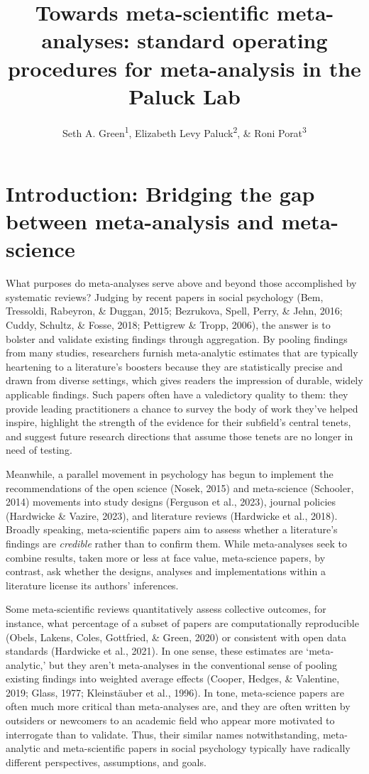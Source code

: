 \documentclass[
  ,jou]{apa6}
\title{Towards meta-scientific meta-analyses: standard operating procedures for meta-analysis in the Paluck Lab}
\author{Seth A. Green\textsuperscript{1}, Elizabeth Levy Paluck\textsuperscript{2}, \& Roni Porat\textsuperscript{3}}
\date{}
\affiliation{\vspace{0.5cm}\textsuperscript{1} Kahneman-Treisman Center, Princeton University\\\textsuperscript{2} Princeton University\\\textsuperscript{3} Hebrew University, Jerusalem}
\begin{document}
\maketitle

\section{Introduction: Bridging the gap between meta-analysis and meta-science}\label{introduction-bridging-the-gap-between-meta-analysis-and-meta-science}

What purposes do meta-analyses serve above and beyond those accomplished by systematic reviews? Judging by recent papers in social psychology (Bem, Tressoldi, Rabeyron, \& Duggan, 2015; Bezrukova, Spell, Perry, \& Jehn, 2016; Cuddy, Schultz, \& Fosse, 2018; Pettigrew \& Tropp, 2006), the answer is to bolster and validate existing findings through aggregation. By pooling findings from many studies, researchers furnish meta-analytic estimates that are typically heartening to a literature's boosters because they are statistically precise and drawn from diverse settings, which gives readers the impression of durable, widely applicable findings. Such papers often have a valedictory quality to them: they provide leading practitioners a chance to survey the body of work they've helped inspire, highlight the strength of the evidence for their subfield's central tenets, and suggest future research directions that assume those tenets are no longer in need of testing.

Meanwhile, a parallel movement in psychology has begun to implement the recommendations of the open science (Nosek, 2015) and meta-science (Schooler, 2014) movements into study designs (Ferguson et al., 2023), journal policies (Hardwicke \& Vazire, 2023), and literature reviews (Hardwicke et al., 2018). Broadly speaking, meta-scientific papers aim to assess whether a literature's findings are \emph{credible} rather than to confirm them. While meta-analyses seek to combine results, taken more or less at face value, meta-science papers, by contrast, ask whether the designs, analyses and implementations within a literature license its authors' inferences.

Some meta-scientific reviews quantitatively assess collective outcomes, for instance, what percentage of a subset of papers are computationally reproducible (Obels, Lakens, Coles, Gottfried, \& Green, 2020) or consistent with open data standards (Hardwicke et al., 2021). In one sense, these estimates are `meta-analytic,' but they aren't meta-analyses in the conventional sense of pooling existing findings into weighted average effects (Cooper, Hedges, \& Valentine, 2019; Glass, 1977; Kleinstäuber et al., 1996). In tone, meta-science papers are often much more critical than meta-analyses are, and they are often written by outsiders or newcomers to an academic field who appear more motivated to interrogate than to validate. Thus, their similar names notwithstanding, meta-analytic and meta-scientific papers in social psychology typically have radically different perspectives, assumptions, and goals.
\end{document}
